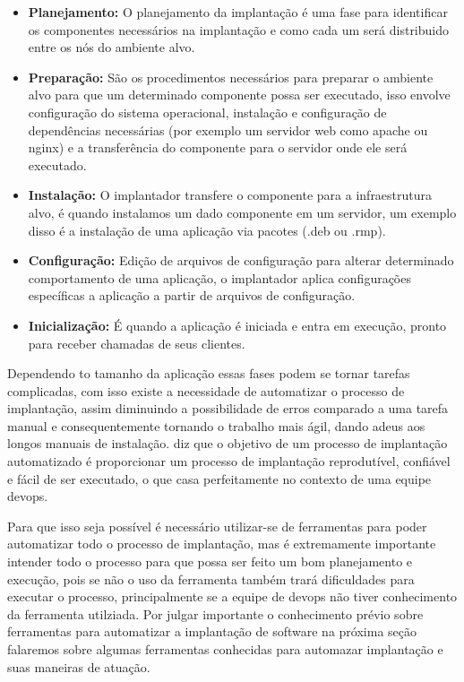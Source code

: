 \begin{itemize}
  \item  \textbf{Planejamento:} O planejamento da implantação é uma fase
  para identificar os componentes necessários na implantação e como cada um será
  distribuido entre os nós do ambiente alvo.
  \item  \textbf{Preparação:} São os procedimentos necessários para preparar o
  ambiente alvo para que um determinado componente possa ser executado, isso envolve
  configuração do sistema operacional, instalação e configuração de dependências
  necessárias (por exemplo um servidor web como apache ou nginx) e a transferência
  do componente para o servidor onde ele será executado.
  \item  \textbf{Instalação:} O implantador transfere o componente para a infraestrutura
  alvo, é quando instalamos um dado componente em um servidor, um exemplo disso
  é a instalação de uma aplicação via pacotes (.deb ou .rmp).
  \item  \textbf{Configuração:} Edição de arquivos de configuração para alterar
  determinado comportamento de uma aplicação, o implantador aplica configurações
  específicas a aplicação a partir de arquivos de configuração.
  \item  \textbf{Inicialização:} É quando a aplicação é iniciada e entra em execução,
  pronto para receber chamadas de seus clientes.
\end{itemize}

Dependendo to tamanho da aplicação essas fases podem se tornar tarefas complicadas,
com isso existe a necessidade de automatizar o processo de implantação, assim
diminuindo a possibilidade de erros comparado a uma tarefa manual e consequentemente
tornando o trabalho mais ágil, dando adeus aos longos manuais de instalação.
\cite{humble2010} diz que o objetivo de um processo de implantação automatizado é
proporcionar um processo de implantação reprodutível, confiável e fácil de ser
executado, o que casa perfeitamente no contexto de uma equipe devops.

Para que isso seja possível é necessário utilizar-se de ferramentas para poder
automatizar todo o processo de implantação, mas é extremamente importante intender todo o processo
para que possa ser feito um bom planejamento e execução, pois se não o uso da ferramenta também
trará dificuldades para executar o processo, principalmente se a equipe de devops não tiver conhecimento
da ferramenta utilziada. Por julgar importante o conhecimento prévio sobre ferramentas
para automatizar a implantação de software na próxima seção falaremos sobre algumas
ferramentas conhecidas para automazar implantação e suas maneiras de atuação.

